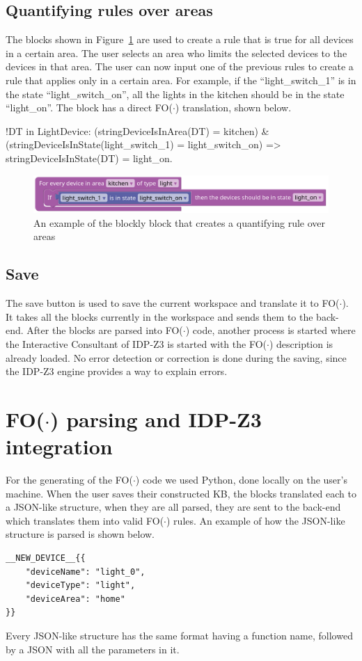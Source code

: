 \documentclass[11pt,a4paper]{report}
\newcommand{\fodot}{FO($\cdot$)\xspace}
\begin{document}
\subsection{Quantifying rules over areas}
The blocks shown in Figure~\ref{fig:homy_enumerate_rule_area} are used to create a rule that is true for all devices in a certain area. The user selects an area who limits the selected devices to the devices in that area. The user can now input one of the previous rules to create a rule that applies only in a certain area. For example, if the ``light\_switch\_1'' is in the state ``light\_switch\_on'', all the lights in the kitchen should be in the state ``light\_on''. The block has a direct \fodot translation, shown below.

\begin{idplisting}
!DT in LightDevice: (stringDeviceIsInArea(DT) = kitchen) & 
(stringDeviceIsInState(light_switch_1) = light_switch_on) => 
stringDeviceIsInState(DT) = light_on.
\end{idplisting}

\begin{figure}
    \centering
    \includegraphics[width=0.8\linewidth]{images/homy_enumerate_rule_area.png}
    \caption{An example of the blockly block that creates a quantifying rule over areas}
    \label{fig:homy_enumerate_rule_area}
\end{figure}

\subsection{Save}
The save button is used to save the current workspace and translate it to \fodot. It takes all the blocks currently in the workspace and sends them to the back-end. After the blocks are parsed into \fodot code, another process is started where the Interactive Consultant of IDP-Z3 is started with the \fodot description is already loaded. No error detection or correction is done during the saving, since the IDP-Z3 engine provides a way to explain errors.

\section{\fodot parsing and IDP-Z3 integration}
For the generating of the \fodot code we used Python, done locally on the user's machine. When the user saves their constructed KB, the blocks translated each to a JSON-like structure, when they are all parsed, they are sent to the back-end which translates them into valid \fodot rules.
An example of how the JSON-like structure is parsed is shown below.
\begin{verbatim}
__NEW_DEVICE__{{
    "deviceName": "light_0", 
    "deviceType": "light", 
    "deviceArea": "home"
}}
\end{verbatim}
Every JSON-like structure has the same format having a function name, followed by a JSON with all the parameters in it.
\end{document}
